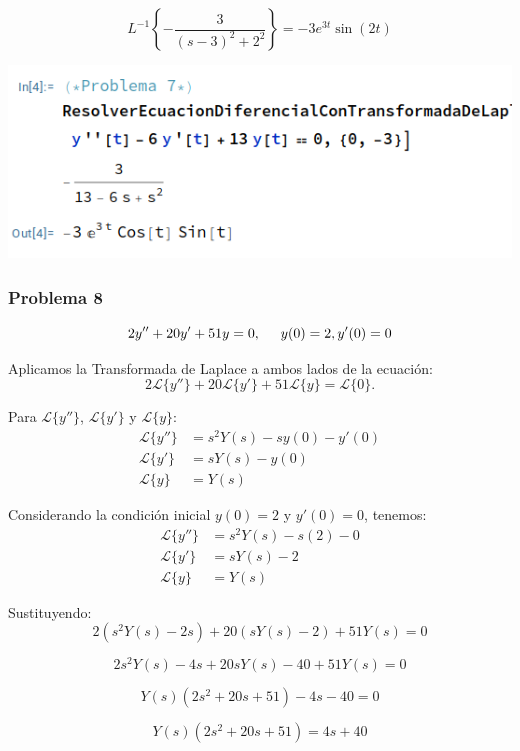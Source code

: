 \documentclass{article}
\begin{document}
\[
    L^{-1}\left\{-\frac{3}{(s-3)^2 + 2^2}\right\} = -3e^{3t} \sin(2t)
\]

\begin{center}
    \includegraphics[width=1\textwidth]{../../ED 2/image8.png}
\end{center}

\newpage

\subsubsection{Problema 8}
\[2y'' + 20y' + 51y = 0, \hspace{.5cm} y(0) = 2, y'(0) = 0\]

Aplicamos la Transformada de Laplace a ambos lados de la ecuación:
\[
    2\mathcal{L}\{y''\} + 20\mathcal{L}\{y'\} + 51\mathcal{L}\{y\} = \mathcal{L}\{0\}.
\]

Para \(\mathcal{L}\{y''\}\), \(\mathcal{L}\{y'\}\) y \(\mathcal{L}\{y\}\):
\begin{align*}
    \mathcal{L}\{y''\} & = s^2Y(s) - sy(0) - y'(0) \\
    \mathcal{L}\{y'\}  & = sY(s) - y(0)            \\
    \mathcal{L}\{y\}   & = Y(s)
\end{align*}

Considerando la condición inicial $y(0) = 2$ y $y'(0) = 0$, tenemos:
\begin{align*}
    \mathcal{L}\{y''\} & = s^2Y(s) - s(2) - 0 \\
    \mathcal{L}\{y'\}  & = sY(s) - 2          \\
    \mathcal{L}\{y\}   & = Y(s)
\end{align*}

Sustituyendo:
\[
    2(s^2Y(s) - 2s) + 20(sY(s) - 2) + 51Y(s) = 0
\]

\[
    2s^2Y(s) - 4s + 20sY(s) - 40 + 51Y(s) = 0
\]

\[
    Y(s)(2s^2 + 20s + 51) - 4s - 40 = 0
\]

\[
    Y(s)(2s^2 + 20s + 51) = 4s + 40
\]
\end{document}
